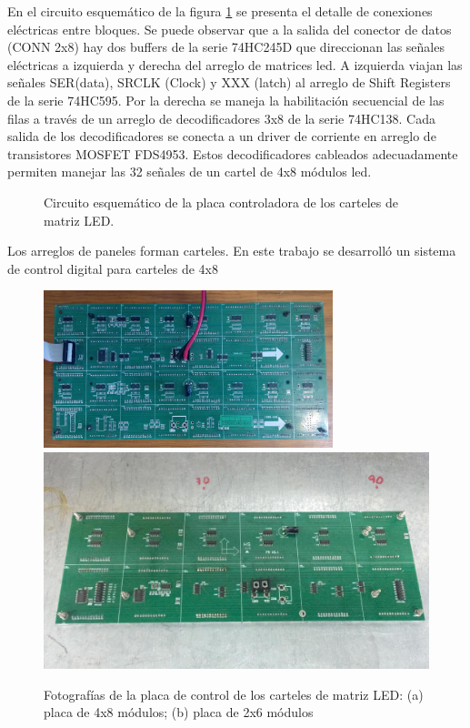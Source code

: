 En el circuito esquemático de la figura \ref{fig:schDriverLED} se presenta el detalle de conexiones eléctricas entre bloques. Se puede observar que a la salida del conector de datos (CONN 2x8) hay dos buffers de la serie 74HC245D que direccionan las señales eléctricas a izquierda y derecha del arreglo de matrices led. A izquierda viajan las señales SER(data), SRCLK (Clock) y XXX (latch) al arreglo de Shift Registers de la serie 74HC595. Por la derecha se maneja la habilitación secuencial de las filas a través de un arreglo de decodificadores 3x8 de la serie 74HC138. Cada salida de los decodificadores se conecta a un driver de corriente en arreglo de transistores MOSFET FDS4953. Estos decodificadores cableados adecuadamente permiten manejar las 32 señales de un cartel de 4x8 módulos led. 

\begin{figure}[ht]
	\centering
	
	\caption{Circuito esquemático de la placa controladora de los carteles de matriz LED.}
	\label{fig:schDriverLED}
\end{figure}

Los arreglos de paneles forman carteles. En este trabajo se desarrolló un sistema de control digital para carteles de 4x8 \\




\begin{figure}[ht]
	\centering
	\includegraphics[width=0.75\textwidth, angle=270]{./Figures/cartel4x8.jpg}\\
	\includegraphics[width=1\textwidth]{./Figures/cartel2x6.jpeg}
	\caption{Fotografías de la placa de control de los carteles de matriz LED: (a) placa de 4x8 módulos; (b) placa de 2x6 módulos}
	\label{fig:picsDriverLED}
\end{figure}



